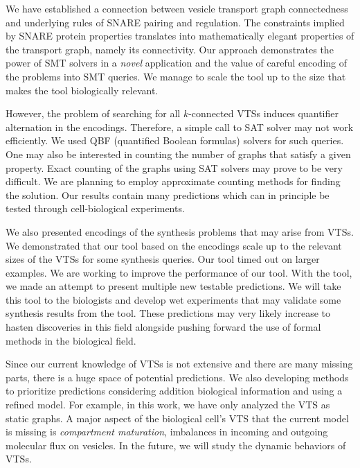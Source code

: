 \noindent 
We have established a connection between vesicle transport graph connectedness and underlying rules of SNARE pairing and regulation. 
%
The constraints implied by SNARE protein properties translates into
mathematically elegant properties of the transport graph, namely its connectivity.
%
Our approach demonstrates the power of SMT solvers in a {\em novel} application and the value of careful encoding of the problems into SMT queries. 
We manage to scale the tool up to the size that makes the tool biologically relevant.
%

However, the problem of searching for all $k$-connected VTSs induces quantifier alternation in the encodings.
%
Therefore, a simple call to SAT solver may not work efficiently. 
%
We used QBF (quantified Boolean
formulas) solvers for such queries.
%
One may also be interested in counting the number of graphs that satisfy
a given property. 
%
Exact counting of the graphs using SAT solvers may prove to be very
difficult. 
%
We are planning to employ approximate counting methods for finding the solution.
%
Our results contain many predictions which can in principle be tested through cell-biological experiments. 

We also presented encodings of the synthesis problems that may arise from VTSs.
%
We demonstrated that our tool based on the encodings
scale up to the relevant sizes of the VTSs for some synthesis queries.
%
Our tool timed out on larger examples.
%
We are working to improve the performance of our tool.
%
%
With the tool, we made an attempt to present multiple new testable predictions. 
%
We will take this tool to the biologists and develop wet experiments that may
validate some synthesis results from the tool.
%
These predictions may very likely increase to hasten discoveries in this field
alongside pushing forward the use of formal methods in the biological field.
%

Since our current knowledge of VTSs is not extensive and there are many missing parts,
there is a huge space of potential predictions.
%
We also developing methods to prioritize predictions considering addition biological
information and using a refined model.
%
For example, in this work, we have only analyzed the VTS as static graphs. A major aspect of the biological cell’s VTS that the current model is missing is \textit{compartment maturation}, imbalances in incoming and outgoing molecular flux on vesicles.
%
In the future, we will study the dynamic behaviors of VTSs.
%
%


%


